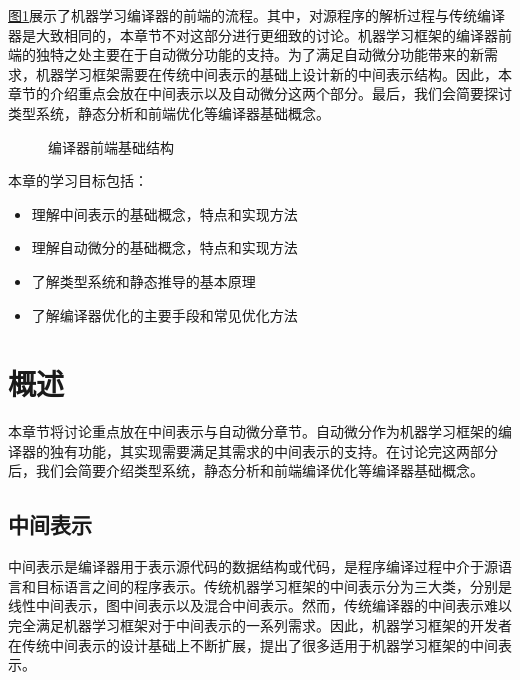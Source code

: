 \documentclass[letterpaper,10pt,english]{sphinxmanual}
\let\sphinxpxdimen\pdfpxdimen\else\newdimen\sphinxpxdimen
\begin{document}
\sphinxAtStartPar
\hyperref[\detokenize{chapter_frontend_and_ir/index:compiler-frontend-structure}]{图\ref{\detokenize{chapter_frontend_and_ir/index:compiler-frontend-structure}}}展示了机器学习编译器的前端的流程。其中，对源程序的解析过程与传统编译器是大致相同的，本章节不对这部分进行更细致的讨论。机器学习框架的编译器前端的独特之处主要在于自动微分功能的支持。为了满足自动微分功能带来的新需求，机器学习框架需要在传统中间表示的基础上设计新的中间表示结构。因此，本章节的介绍重点会放在中间表示以及自动微分这两个部分。最后，我们会简要探讨类型系统，静态分析和前端优化等编译器基础概念。

\begin{figure}[H]
\centering
\capstart

\noindent\sphinxincludegraphics[width=1000\sphinxpxdimen]{{编译器前端基础架构}.svg}
\caption{编译器前端基础结构}\label{\detokenize{chapter_frontend_and_ir/index:id2}}\label{\detokenize{chapter_frontend_and_ir/index:compiler-frontend-structure}}\end{figure}

\sphinxAtStartPar
本章的学习目标包括：
\begin{itemize}
\item {} 
\sphinxAtStartPar
理解中间表示的基础概念，特点和实现方法

\item {} 
\sphinxAtStartPar
理解自动微分的基础概念，特点和实现方法

\item {} 
\sphinxAtStartPar
了解类型系统和静态推导的基本原理

\item {} 
\sphinxAtStartPar
了解编译器优化的主要手段和常见优化方法

\end{itemize}


\section{概述}
\label{\detokenize{chapter_frontend_and_ir/overview_of_frontend:id1}}\label{\detokenize{chapter_frontend_and_ir/overview_of_frontend::doc}}
\sphinxAtStartPar
本章节将讨论重点放在中间表示与自动微分章节。自动微分作为机器学习框架的编译器的独有功能，其实现需要满足其需求的中间表示的支持。在讨论完这两部分后，我们会简要介绍类型系统，静态分析和前端编译优化等编译器基础概念。


\subsection{中间表示}
\label{\detokenize{chapter_frontend_and_ir/overview_of_frontend:id2}}
\sphinxAtStartPar
中间表示是编译器用于表示源代码的数据结构或代码，是程序编译过程中介于源语言和目标语言之间的程序表示。传统机器学习框架的中间表示分为三大类，分别是线性中间表示，图中间表示以及混合中间表示。然而，传统编译器的中间表示难以完全满足机器学习框架对于中间表示的一系列需求。因此，机器学习框架的开发者在传统中间表示的设计基础上不断扩展，提出了很多适用于机器学习框架的中间表示。
\end{document}
